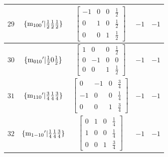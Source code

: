 \documentclass[fleqn,8pt]{jsarticle}
\begin{document}
\begin{longtable}{ccccc}
$ 29 $ & $ \{{\rm m}_{100}{}'|\frac{1}{2} \frac{1}{2} \frac{1}{2}\} $ & $ \begin{bmatrix} -1 & 0 & 0 & \frac{1}{2} \\ 0 & 1 & 0 & \frac{1}{2} \\ 0 & 0 & 1 & \frac{1}{2} \end{bmatrix} $ & $ -1 $ & $ -1 $ \\ \hline
$ 30 $ & $ \{{\rm m}_{010}{}'|\frac{1}{2} 0 \frac{1}{2}\} $ & $ \begin{bmatrix} 1 & 0 & 0 & \frac{1}{2} \\ 0 & -1 & 0 & 0 \\ 0 & 0 & 1 & \frac{1}{2} \end{bmatrix} $ & $ -1 $ & $ -1 $ \\ \hline
$ 31 $ & $ \{{\rm m}_{110}{}'|\frac{3}{4} \frac{1}{4} \frac{3}{4}\} $ & $ \begin{bmatrix} 0 & -1 & 0 & \frac{3}{4} \\ -1 & 0 & 0 & \frac{1}{4} \\ 0 & 0 & 1 & \frac{3}{4} \end{bmatrix} $ & $ -1 $ & $ -1 $ \\ \hline
$ 32 $ & $ \{{\rm m}_{1-10}{}'|\frac{1}{4} \frac{1}{4} \frac{3}{4}\} $ & $ \begin{bmatrix} 0 & 1 & 0 & \frac{1}{4} \\ 1 & 0 & 0 & \frac{1}{4} \\ 0 & 0 & 1 & \frac{3}{4} \end{bmatrix} $ & $ -1 $ & $ -1 $ \\
\end{longtable}
\end{document}
